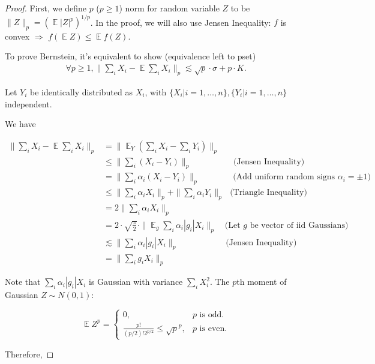 \documentclass[11pt]{article}
\DeclareMathOperator*{\E}{\mathbb{E}}
\begin{document}
\begin{proof}
First, we define $p$ ($p\ge 1$) norm for random variable $Z$ to be $\| Z\|_p=(\E |Z|^p)^{1/p}$. In the proof, we will also use Jensen Inequality: $f$ is convex $\Rightarrow$ $f(\E Z)\le \E f(Z)$.

To prove Bernstein, it's equivalent to show (equivalence left to pset)
\begin{align}
\forall p \ge 1, \|\sum_i{X_i}-\E \sum_i{X_i}\|_p\lesssim \sqrt{p}\cdot \sigma+p\cdot K.
\end{align}


Let $Y_i$ be identically distributed as $X_i$, with $\{X_i|i=1,\ldots,n\}, \{Y_i|i=1,\ldots,n\}$ independent. 

We have

\begin{align}
\| \sum_i{X_i} - \E \sum_i{X_i} \|_p &= \| \E_Y (\sum_i{X_i} - \sum_i{Y_i})\|_p \label{st} \\ 
&\le \|\sum_i(X_i-Y_i)\|_p \text{ ~~~~~~~~~~~~~  (Jensen Inequality)} \\
&= \|\sum_i\alpha_i(X_i-Y_i)\|_p  \text{  ~~~~~~~~~~~(Add uniform random signs $\alpha_i=\pm 1$)} \\
& \le \|\sum_i\alpha_i X_i\|_p+\| \sum_i {\alpha_iY_i}\|_p \text{   ~(Triangle Inequality)} \\
&= 2\|\sum_i {\alpha_iX_i} \|_p \\
&= 2\cdot \sqrt{\frac{\pi}{2}} \cdot \| \E_g \sum_i {\alpha_i |g_i| X_i} \|_p \text{~~~(Let $g$ be vector of iid Gaussians)}\\ 
&\lesssim \|\sum_i{\alpha_i |g_i| X_i}\|_p  \text{~~~~~~~~~~~~~~~~~(Jensen Inequality)} \\
&= \|\sum_{i} {g_iX_i} \|_p \label{ed}
\end{align}

Note that $\sum_i{\alpha_i |g_i| X_i}$ is Gaussian with variance $\sum_i{X_i^2}$. The $p$th moment of Gaussian $Z \sim N(0, 1)$: 

\begin{equation}
  \E Z^p=\begin{cases}
    0, & p \text{ is odd}.\\
    \frac{p!}{(p/2)!2^{p/2}} \le \sqrt{p}^p, & p \text{ is even}.
  \end{cases}
\end{equation}

Therefore,


\end{proof}
\end{document}
